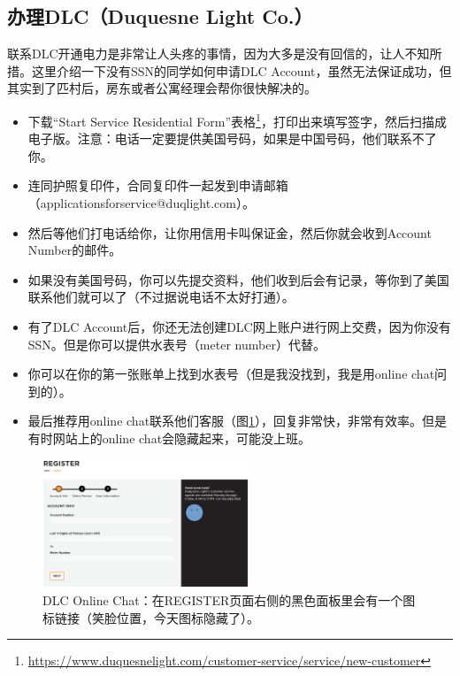 \documentclass[letterpaper,10pt]{article}
\begin{document}
	\subsection{办理DLC（Duquesne Light Co.）}
	
	联系DLC开通电力是非常让人头疼的事情，因为大多是没有回信的，让人不知所措。这里介绍一下没有SSN的同学如何申请DLC Account，虽然无法保证成功，但其实到了匹村后，房东或者公寓经理会帮你很快解决的。
	
	\begin{itemize}
		\item 下载“Start Service Residential Form”表格\footnote{\url{https://www.duquesnelight.com/customer-service/service/new-customer}}，打印出来填写签字，然后扫描成电子版。注意：电话一定要提供美国号码，如果是中国号码，他们联系不了你。
		\item 连同护照复印件，合同复印件一起发到申请邮箱（applicationsforservice@duqlight.com）。
		\item 然后等他们打电话给你，让你用信用卡叫保证金，然后你就会收到Account Number的邮件。
		\item 如果没有美国号码，你可以先提交资料，他们收到后会有记录，等你到了美国联系他们就可以了（不过据说电话不太好打通）。
		\item 有了DLC Account后，你还无法创建DLC网上账户进行网上交费，因为你没有SSN。但是你可以提供水表号（meter number）代替。
		\item 你可以在你的第一张账单上找到水表号（但是我没找到，我是用online chat问到的）。
		\item 最后推荐用online chat联系他们客服（图\ref{fig:dlc}），回复非常快，非常有效率。但是有时网站上的online chat会隐藏起来，可能没上班。
	\end{itemize}
	
	\begin{figure}[!h]
		\centering
		\includegraphics[width=0.55\textwidth]{./img/dlc}
		\caption{DLC Online Chat：在REGISTER页面右侧的黑色面板里会有一个图标链接（笑脸位置，今天图标隐藏了）。}
		\label{fig:dlc}
	\end{figure}
	
\end{document}
